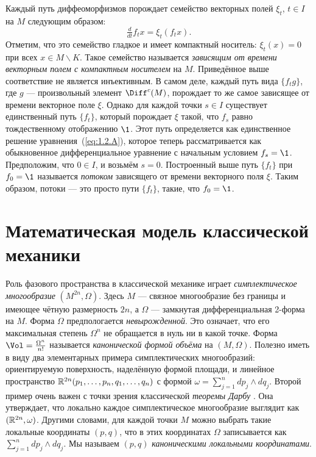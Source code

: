 Каждый путь диффеоморфизмов порождает семейство векторных полей $\xi_t$, $t \in I$ на $M$ следующим образом: 
\begin{equation}\tfrac{d}{dt} f_t x = \xi_t (f_t x).
\label{eq:1.2.A}
\end{equation}
Отметим, что это семейство гладкое и имеет компактный носитель: $\xi_t (x) = 0$ при всех $x \in M \backslash K$.
Такое семейство называется \textit{зависящим от времени векторным полем с компактным носителем} на $M$.
Приведённое выше соответствие не является инъективным.
В самом деле, каждый путь вида $\{f_t g\}$, где $g$ — произвольный элемент $\Diff^c (M)$, порождает то же самое зависящее от времени векторное поле $\xi$.
Однако для каждой точки $s \in I$ существует единственный путь $\{f_t\}$, который 
порождает $\xi$ такой, что $f_s$ равно тождественному отображению $\1$.
Этот путь определяется как единственное решение уравнения~(\ref{eq:1.2.A}), которое теперь рассматривается как обыкновенное дифференциальное уравнение с начальным условием $f_s = \1$.
Предположим, что $0 \in I$, и возьмём $s = 0$.
Построенный выше путь $\{f_t\}$ при $f_0 = \1$ называется \emph{потоком} зависящего от времени векторного поля $\xi$.
Таким образом, потоки — это просто пути $\{f_t\}$, такие, что $f_0 = \1$.

\section[Классическая механика]{Математическая модель классической механики}

Роль фазового пространства в классической механике играет \emph{симплектическое многообразие} $(M^{2n},\Omega)$.
Здесь $M$ — связное многообразие без границы и имеющее чётную размерность $2n$, а $\Omega$ — замкнутая дифференциальная 2-форма на $M$.
Форма $\Omega$ предпологается {}\emph{невырожденной}.
Это означает, что его максимальная степень $\Omega^n$ не обращается в нуль ни в какой точке.
Форма $\Vol =  \tfrac{\Omega^n}{n!}$ называется \emph{канонической формой объёма} на $(M, \Omega)$.
Полезно иметь в виду два элементарных примера симплектических многообразий:
ориентируемую поверхность, наделённую формой площади, и линейное пространство $\mathbb{R}^{2n} (p_1,\dots, p_n, q_1,\dots, q_n)$ с формой $\omega = \sum^n_{j = 1} dp_j \wedge dq_j$.
Второй пример очень важен с точки зрения классической \emph{теоремы Дарбу} \cite{MS}.
Она утверждает, что локально каждое симплектическое многообразие выглядит как $(\mathbb{R}^{2n}, \omega)$.
Другими словами, для каждой точки $M$ можно выбрать такие локальные координаты $(p, q)$, что в этих координатах $\Omega$ записывается как $\sum^n_{j = 1} dp_j \wedge dq_j$.
Мы называем $(p, q)$ \emph{каноническими локальными координатами}.


